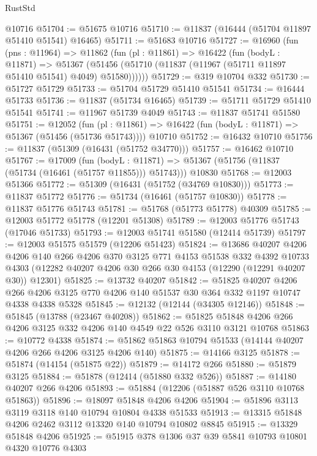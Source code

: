 \begin{lexlean}{RustStd}
\begin{coremodule}
    @10716
@51704 := @51675 @10716
@51710 := @11837 (@16444 (@51704 @11897 @51410 @51541) @16465)
@51711 := @51683 @10716
@51727 := @16960
    (fun (pns : @11964) =>
    @11862
      (fun (pl : @11861) =>
      @16422
        (fun (bodyL : @11871) =>
        @51367 (@51456 (@51710 (@11837 (@11967 (@51711 @11897 @51410 @51541) @4049) @51580))))))
@51729 := @319 @10704 @332
@51730 := @51727 @51729
@51733 := @51704 @51729 @51410 @51541
@51734 := @16444 @51733
@51736 := @11837 (@51734 @16465)
@51739 := @51711 @51729 @51410 @51541
@51741 := @11967 @51739 @4049
@51743 := @11837 @51741 @51580
@51751 := @12052
    (fun (pl : @11861) => @16422 (fun (bodyL : @11871) => @51367 (@51456 (@51736 @51743))))
    @10710
@51752 := @16432 @10710
@51756 := @11837 (@51309 (@16431 (@51752 @34770)))
@51757 := @16462 @10710
@51767 := @17009
    (fun (bodyL : @11871) => @51367 (@51756 (@11837 (@51734 (@16461 (@51757 @11855))) @51743)))
    @10830
@51768 := @12003 @51366
@51772 := @51309 (@16431 (@51752 (@34769 @10830)))
@51773 := @11837 @51772
@51776 := @51734 (@16461 (@51757 @10830))
@51778 := @11837 @51776 @51743
@51781 := @51768 (@51773 @51778) @40309
@51785 := @12003 @51772 @51778 (@12201 @51308)
@51789 := @12003 @51776 @51743 (@17046 @51733)
@51793 := @12003 @51741 @51580 (@12414 @51739)
@51797 := @12003 @51575 @51579 (@12206 @51423)
@51824 := @13686
    @40207
    @4206
    @4206
    @140
    @266
    @4206
    @370
    @3125
    @771
    @4153
    @51538
    @332
    @4392
    @10733
    @4303
    (@12282 @40207 @4206 @30 @266 @30 @4153 (@12290 (@12291 @40207 @30)) @12301)
@51825 := @13732 @40207
@51842 := @51825
    @40207
    @4206
    @266
    @4206
    @3125
    @770
    @4206
    @140
    @51537
    @30
    @364
    @332
    @1197
    @10747
    @4338
    @4338
    @5328
@51845 := @12132 (@12144 (@34305 @12146))
@51848 := @51845 (@13788 (@23467 @40208))
@51862 := @51825 @51848 @4206 @266 @4206 @3125 @332 @4206 @140 @4549 @22 @526 @3110 @3121 @10768
@51863 := @10772 @4338
@51874 := @51862 @51863 @10794 @51533 (@14144 @40207 @4206 @266 @4206 @3125 @4206 @140)
@51875 := @14166 @3125
@51878 := @51874 (@14154 (@51875 @22))
@51879 := @14172 @266
@51880 := @51879 @3125
@51884 := @51878 (@12414 (@51880 @332 @526))
@51887 := @14180 @40207 @266 @4206
@51893 := @51884 (@12206 (@51887 @526 @3110 @10768 @51863))
@51896 := @18097 @51848 @4206 @4206
@51904 := @51896 @3113 @3119 @3118 @140 @10794 @10804 @4338 @51533
@51913 := @13315 @51848 @4206 @2462 @3112 @13320 @140 @10794 @10802 @8845
@51915 := @13329 @51848 @4206
@51925 := @51915 @378 @1306 @37 @39 @5841 @10793 @10801 @4320 @10776 @4303

\end{coremodule}
\end{lexlean}
